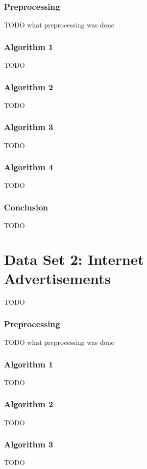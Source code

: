 \documentclass{sig-alternate-05-2015}
\begin{document}
\subsubsection{Preprocessing}
TODO what preprocessing was done\\
\subsubsection{Algorithm 1}
TODO\\
\subsubsection{Algorithm 2}
TODO\\
\subsubsection{Algorithm 3}
TODO\\
\subsubsection{Algorithm 4}
TODO\\
\subsubsection{Conclusion}
TODO\\


\section{Data Set 2: Internet Advertisements}
TODO\\
\subsubsection{Preprocessing}
TODO what preprocessing was done\\
\subsubsection{Algorithm 1}
TODO\\
\subsubsection{Algorithm 2}
TODO\\
\subsubsection{Algorithm 3}
TODO\\
\end{document}
